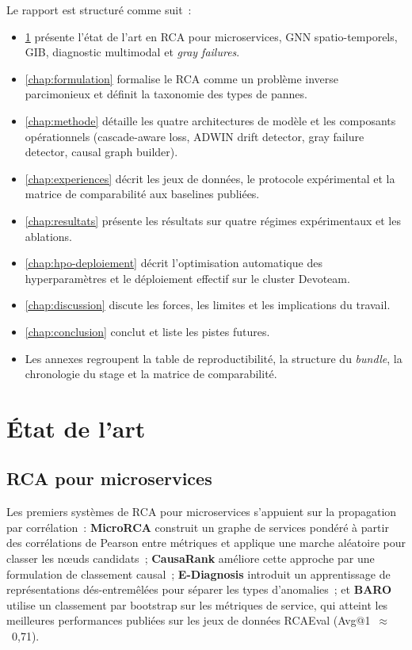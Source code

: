 \documentclass[a4paper,11pt,oneside]{report}
\begin{document}
Le rapport est structur\'e comme suit~:
\begin{itemize}
  \item \cref{chap:etat-de-lart} pr\'esente l'\'etat de l'art en RCA pour microservices, GNN spatio-temporels, GIB, diagnostic multimodal et \emph{gray failures}.
  \item \cref{chap:formulation} formalise le RCA comme un probl\`eme inverse parcimonieux et d\'efinit la taxonomie des types de pannes.
  \item \cref{chap:methode} d\'etaille les quatre architectures de mod\`ele et les composants op\'erationnels (cascade-aware loss, ADWIN drift detector, gray failure detector, causal graph builder).
  \item \cref{chap:experiences} d\'ecrit les jeux de donn\'ees, le protocole exp\'erimental et la matrice de comparabilit\'e aux baselines publi\'ees.
  \item \cref{chap:resultats} pr\'esente les r\'esultats sur quatre r\'egimes exp\'erimentaux et les ablations.
  \item \cref{chap:hpo-deploiement} d\'ecrit l'optimisation automatique des hyperparam\`etres et le d\'eploiement effectif sur le cluster Devoteam.
  \item \cref{chap:discussion} discute les forces, les limites et les implications du travail.
  \item \cref{chap:conclusion} conclut et liste les pistes futures.
  \item Les annexes regroupent la table de reproductibilit\'e, la structure du \emph{bundle}, la chronologie du stage et la matrice de comparabilit\'e.
\end{itemize}

\chapter{\'Etat de l'art}
\label{chap:etat-de-lart}

\section{RCA pour microservices}
\label{sec:eda-rca}

Les premiers syst\`emes de RCA pour microservices s'appuient sur la propagation par corr\'elation~: \textbf{MicroRCA} construit un graphe de services pond\'er\'e \`a partir des corr\'elations de Pearson entre m\'etriques et applique une marche al\'eatoire pour classer les nœuds candidats~; \textbf{CausaRank} am\'eliore cette approche par une formulation de classement causal~; \textbf{E-Diagnosis} introduit un apprentissage de repr\'esentations d\'es-entrem\^el\'ees pour s\'eparer les types d'anomalies~; et \textbf{BARO} utilise un classement par bootstrap sur les m\'etriques de service, qui atteint les meilleures performances publi\'ees sur les jeux de donn\'ees RCAEval (Avg@1~$\approx$~0{,}71).
\end{document}
